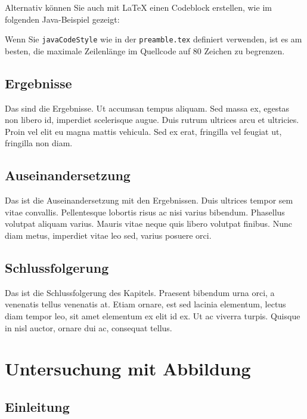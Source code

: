 \documentclass[listof=totoc,index=totoc,bibliography=totoc,12pt,ngerman,a4paper,]{report}
\begin{document}
Alternativ können Sie auch mit LaTeX einen Codeblock erstellen, wie im
folgenden Java-Beispiel gezeigt:



Wenn Sie \texttt{javaCodeStyle} wie in der \texttt{preamble.tex}
definiert verwenden, ist es am besten, die maximale Zeilenlänge im
Quellcode auf 80 Zeichen zu begrenzen.

\section{Ergebnisse}\label{ergebnisse}

Das sind die Ergebnisse. Ut accumsan tempus aliquam. Sed massa ex,
egestas non libero id, imperdiet scelerisque augue. Duis rutrum ultrices
arcu et ultricies. Proin vel elit eu magna mattis vehicula. Sed ex erat,
fringilla vel feugiat ut, fringilla non diam.

\section{Auseinandersetzung}\label{auseinandersetzung}

Das ist die Auseinandersetzung mit den Ergebnissen. Duis ultrices tempor
sem vitae convallis. Pellentesque lobortis risus ac nisi varius
bibendum. Phasellus volutpat aliquam varius. Mauris vitae neque quis
libero volutpat finibus. Nunc diam metus, imperdiet vitae leo sed,
varius posuere orci.

\section{Schlussfolgerung}\label{schlussfolgerung}

Das ist die Schlussfolgerung des Kapitels. Praesent bibendum urna orci,
a venenatis tellus venenatis at. Etiam ornare, est sed lacinia
elementum, lectus diam tempor leo, sit amet elementum ex elit id ex. Ut
ac viverra turpis. Quisque in nisl auctor, ornare dui ac, consequat
tellus.

\chapter{Untersuchung mit Abbildung}\label{sec:research-figure}

\section{Einleitung}\label{einleitung-2}
\end{document}
